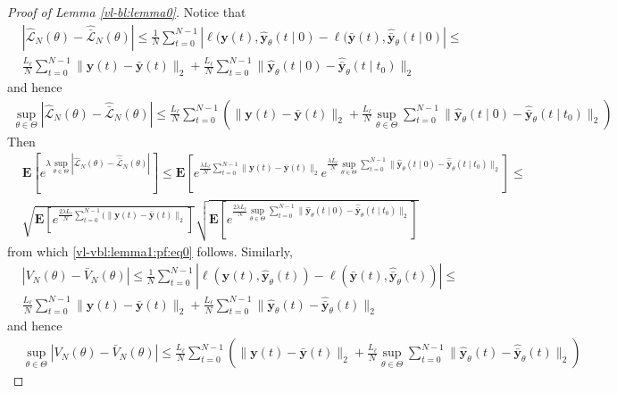 \documentclass{article}
\def\rvy{{\mathbf{y}}}
\newcommand{\y}{\mathbf{y}}
\newcommand{\bE}{\mathbf{E}}
\begin{document}
\begin{proof}[Proof of Lemma \ref{vl-bl:lemma0}]
   Notice that  
\begin{align*}
   &  |\hat{\mathcal{L}}_N(\theta) - \hat{\bar{\mathcal{L}}}_N(\theta)| \le 
    \frac{1}{N} \sum_{t=0}^{N-1}|\ell(\y(t),\hat{\rvy}_{\theta}(t \mid 0) 
    - \ell(\bar{\rvy}(t),\hat{\bar{\rvy}}_{\theta}(t \mid 0)|
  \le \\
  & \frac{L_{\ell}}{N} \sum_{t=0}^{N-1}
    \|\y(t)-\bar{\y}(t)\|_2+\frac{L_{\ell}}{N} \sum_{t=0}^{N-1} \|\hat{\rvy}_{\theta}(t \mid 0)-\hat{\bar{\rvy}}_{\theta}(t \mid t_0)\|_2
\end{align*}
and hence 
\begin{align*}
\sup_{\theta \in \Theta} |\hat{\mathcal{L}}_N(\theta) - \hat{\bar{\mathcal{L}}}_N(\theta)| \le 
 \frac{L_{\ell}}{N} \sum_{t=0}^{N-1}
    (\|\y(t)-\bar{\y}(t)\|_2+\frac{L_{\ell}}{N}  \sup_{\theta \in \Theta} \sum_{t=0}^{N-1} \|\hat{\rvy}_{\theta}(t \mid 0)-\hat{\bar{\rvy}}_{\theta}(t \mid t_0)\|_2)
\end{align*}
Then \begin{align*}
   & \bE[e^{\lambda \sup_{\theta \in \Theta} |\hat{\mathcal{L}}_N(\theta) - \hat{\bar{\mathcal{L}}}_N(\theta)|}]
   \le \bE[e^{\frac{\lambda L_{\ell}}{N} \sum_{t=0}^{N-1}
    \|\y(t)-\bar{\y}(t)\|_2} e^{\frac{\lambda L_{\ell}}{N} \sup_{\theta \in \Theta}\sum_{t=0}^{N-1} \|\hat{\rvy}_{\theta}(t \mid 0)-\hat{\bar{\rvy}}_{\theta}(t \mid t_0)\|_2}]
    \le \\
    & \sqrt{\bE[e^{\frac{2 \lambda L_{\ell}}{N} \sum_{t=0}^{N-1}
    (\|\y(t)-\bar{\y}(t)\|_2}]}
    \sqrt{\bE[e^{\frac{2\lambda L_{\ell}}{N} \sup_{\theta \in \Theta} 
    \sum_{t=0}^{N-1} \|\hat{\rvy}_{\theta}(t \mid 0)-\hat{\bar{\rvy}}_{\theta}(t \mid t_0)\|_2}]}
\end{align*}
from which \eqref{vl-vbl:lemma1:pf:eq0} follows.
Similarly, 
\begin{align*}
   &  |V_N(\theta) - \bar{V}_N(\theta)| \le 
    \frac{1}{N} \sum_{t=0}^{N-1}|\ell(\y(t),\hat{\rvy}_{\theta}(t)) 
    - \ell(\bar{\rvy}(t),\hat{\bar{\rvy}}_{\theta}(t))|
  \le \\
  & \frac{L_{\ell}}{N} \sum_{t=0}^{N-1}
    \|\y(t)-\bar{\y}(t)\|_2+\frac{L_{\ell}}{N} \sum_{t=0}^{N-1} \|\hat{\rvy}_{\theta}(t)-\hat{\bar{\rvy}}_{\theta}(t)\|_2
\end{align*}
and hence
\begin{align*}
  & \sup_{\theta \in \Theta} |V_N(\theta) - \bar{V}_N(\theta)| \le 
    \frac{L_{\ell}}{N} \sum_{t=0}^{N-1}
    (\|\y(t)-\bar{\y}(t)\|_2+\frac{L_{\ell}}{N} \sup_{\theta \in \Theta} \sum_{t=0}^{N-1} \|\hat{\rvy}_{\theta}(t)-\hat{\bar{\rvy}}_{\theta}(t)\|_2)

\end{align*}
\end{proof}
\end{document}
